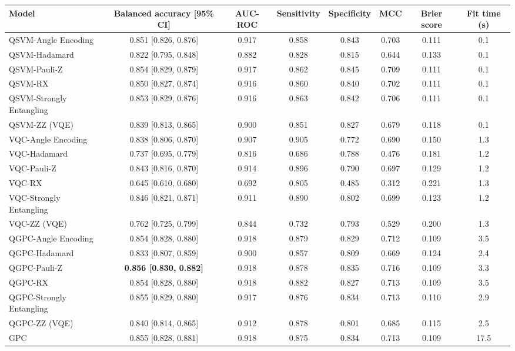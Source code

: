 \begin{tabular}{lccccccc}
\toprule
Model & Balanced accuracy [95\% CI] & AUC-ROC & Sensitivity & Specificity & MCC & Brier score & Fit time (s) \\
\midrule
QSVM-Angle Encoding & 0.851 [0.826, 0.876] & 0.917 & 0.858 & 0.843 & 0.703 & 0.111 & 0.1 \\
QSVM-Hadamard & 0.822 [0.795, 0.848] & 0.882 & 0.828 & 0.815 & 0.644 & 0.133 & 0.1 \\
QSVM-Pauli-Z & 0.854 [0.829, 0.879] & 0.917 & 0.862 & 0.845 & 0.709 & 0.111 & 0.1 \\
QSVM-RX & 0.850 [0.827, 0.874] & 0.916 & 0.860 & 0.840 & 0.702 & 0.111 & 0.1 \\
QSVM-Strongly Entangling & 0.853 [0.829, 0.876] & 0.916 & 0.863 & 0.842 & 0.706 & 0.111 & 0.1 \\
QSVM-ZZ (VQE) & 0.839 [0.813, 0.865] & 0.900 & 0.851 & 0.827 & 0.679 & 0.118 & 0.1 \\
\midrule
VQC-Angle Encoding & 0.838 [0.806, 0.870] & 0.907 & 0.905 & 0.772 & 0.690 & 0.150 & 1.3 \\
VQC-Hadamard & 0.737 [0.695, 0.779] & 0.816 & 0.686 & 0.788 & 0.476 & 0.181 & 1.2 \\
VQC-Pauli-Z & 0.843 [0.816, 0.870] & 0.914 & 0.896 & 0.790 & 0.697 & 0.129 & 1.2 \\
VQC-RX & 0.645 [0.610, 0.680] & 0.692 & 0.805 & 0.485 & 0.312 & 0.221 & 1.3 \\
VQC-Strongly Entangling & 0.846 [0.821, 0.871] & 0.911 & 0.890 & 0.802 & 0.699 & 0.123 & 1.2 \\
VQC-ZZ (VQE) & 0.762 [0.725, 0.799] & 0.844 & 0.732 & 0.793 & 0.529 & 0.200 & 1.3 \\
\midrule
QGPC-Angle Encoding & 0.854 [0.828, 0.880] & 0.918 & 0.879 & 0.829 & 0.712 & 0.109 & 3.5 \\
QGPC-Hadamard & 0.833 [0.807, 0.859] & 0.900 & 0.857 & 0.809 & 0.669 & 0.124 & 2.4 \\
QGPC-Pauli-Z & \textbf{0.856 [0.830, 0.882]} & 0.918 & 0.878 & 0.835 & 0.716 & 0.109 & 3.3 \\
QGPC-RX & 0.854 [0.828, 0.880] & 0.918 & 0.882 & 0.827 & 0.713 & 0.109 & 3.5 \\
QGPC-Strongly Entangling & 0.855 [0.829, 0.880] & 0.917 & 0.876 & 0.834 & 0.713 & 0.110 & 2.9 \\
QGPC-ZZ (VQE) & 0.840 [0.814, 0.865] & 0.912 & 0.878 & 0.801 & 0.685 & 0.115 & 2.5 \\
\midrule
GPC & 0.855 [0.828, 0.881] & 0.918 & 0.875 & 0.834 & 0.713 & 0.109 & 17.5 \\

\end{tabular}
